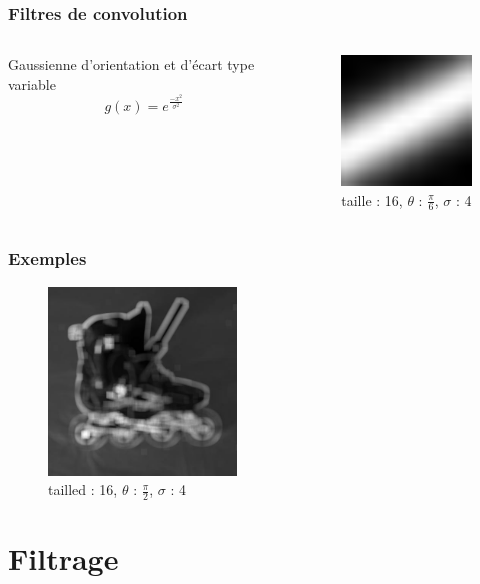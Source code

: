 \documentclass[french]{beamer}
\begin{document}
\begin{frame}
	\frametitle{Filtres de convolution}
	\begin{columns}
		\begin{column}{5cm}
			Gaussienne d'orientation et d'écart type variable
			$$g(x) = e^{\frac{-x^2}{\sigma^2}}$$
		\end{column}
		\begin{column}{5cm}
			\begin{figure}[!h]
				\centering
				\includegraphics[width=4cm]{images/fgauss.jpg}
				\caption{taille : 16, $\theta$ : $\frac{\pi}{6}$, $\sigma$ : 4}
			\end{figure}
		\end{column}
	\end{columns}
\end{frame}

\begin{frame}
	\frametitle{Exemples}
	\begin{figure}
		\centering
		\includegraphics[width=5cm]{images/roller_resp.jpg}
		\caption{tailled : 16, $\theta$ : $\frac{\pi}{2}$, $\sigma$ : 4}
	\end{figure}
\end{frame}

\section{Filtrage}
\end{document}
